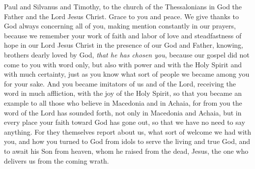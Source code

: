 
\begin{biblechapter} %
 Paul and Silvanus and Timothy, to the church of the Thessalonians in God the Father and the Lord Jesus Christ. Grace to you and peace.
 We give thanks to God always concerning all of you, making mention constantly in our prayers,
\verse because we remember your work of faith and labor of love and steadfastness of hope in our Lord Jesus Christ in the presence of our God and Father,
\verse knowing, brothers dearly loved by God, \textit{that he has chosen you},
\verse because our gospel did not come to you with word only, but also with power and with the Holy Spirit and with much certainty, just as you know what sort of people we became among you for your sake.
\verse And you became imitators of us and of the Lord, receiving the word in much affliction, with the joy of the Holy Spirit,
\verse so that you became an example to all those who believe in Macedonia and in Achaia,
\verse for from you the word of the Lord has sounded forth, not only in Macedonia and Achaia, but in every place your faith toward God has gone out, so that we have no need to say anything.
\verse For they themselves report about us, what sort of welcome we had with you, and how you turned to God from idols to serve the living and true God,
\verse and to await his Son from heaven, whom he raised from the dead, Jesus, the one who delivers us from the coming wrath.
\end{biblechapter}

